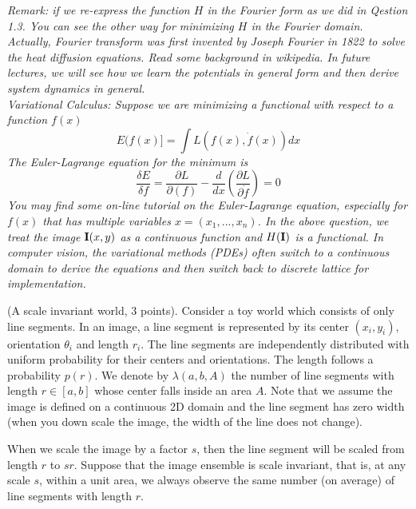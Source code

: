 \documentclass[11pt]{article}
\newcommand{\I}{{\bf I}}
\begin{document}
{\em Remark: if we re-express the function $H$ in the Fourier form as we did in Qestion 1.3.  You can see the other way for minimizing $H$ in the Fourier domain. Actually, Fourier transform was first invented by Joseph Fourier in 1822   to solve the heat diffusion equations.  Read some background in wikipedia. In future lectures, we will see how we learn the potentials in general form and then derive system dynamics in general.}\\


{\em  Variational Calculus: Suppose we are minimizing a functional with respect to
a function $f(x)$
\[  E(f(x)]  = \int L(f(x), \dot{f}(x))dx \]
The Euler-Lagrange equation for the minimum is
\[
     \frac{\delta E}{\delta f} = \frac{\partial L}{\partial(f)} - \frac{d }{dx}(\frac{\partial L}{\partial \dot{f}}) =0
\]
You may find some on-line tutorial on the Euler-Lagrange equation, especially for $f(x)$ that  has multiple variables $x=(x_1, ...,x_n)$.
In the above question, we treat the image $\I(x,y)$ as a continuous
function and $H(\I)$ is a functional. In computer vision, the
variational methods (PDEs) often switch to a continuous domain to
derive the equations and then switch back to discrete lattice for
implementation. }

\vspace{0.5cm}

  (A scale invariant world, 3 points).
Consider a toy world which consists of only line segments. In an
image, a line segment is represented by its center $(x_i,y_i)$,
orientation $\theta_i$ and length $r_i$.  The line segments are
independently distributed with uniform probability for their centers
and orientations. The length follows a probability $p(r)$. We denote
by $\lambda(a,b, A)$ the number of line segments with length $r\in
[a,b]$ whose center falls inside an area $A$. Note that we assume
the image is defined on a continuous 2D domain and the line segment
has zero width (when you down scale the image, the width of the line
does not change).

When we scale the image by a factor $s$, then the line segment will
 be scaled from length $r$ to $sr$.  Suppose that the image
 ensemble is scale invariant, that is, at any scale $s$, within a
 unit area, we always observe the same number (on average) of line
 segments with length $r$.
\end{document}
